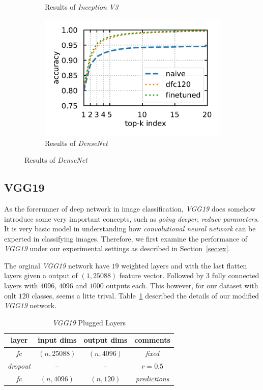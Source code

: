 \documentclass{article}
\begin{document}
\begin{figure}[h]
\begin{subfigure}{0.48\linewidth}
		\caption{Results of \emph{Inception V3}}
		\label{fig:incetionp}
	\end{subfigure} 
	\begin{subfigure}{0.48\linewidth}
		\centering
		\includegraphics[width=\linewidth]{pics/DenseNet}
		\caption{Results of \emph{DenseNet}}
		\label{fig:densenet}
	\end{subfigure} 
\end{figure}

\subsection{VGG19}
As the forerunner of deep network in image classification, \emph{VGG19} does somehow introduce some very important concepts, such as \emph{going deeper}, \emph{reduce parameters}. 
It is very basic model in understanding how \emph{convolutional neural network} can be experted in classifying images. 
Therefore, we first examine the performance of \emph{VGG19} under our experimental settings as described in Section~\ref{sec:ex}.

The orginal \emph{VGG19} network have $19$ weighted layers and with the last flatten layers given a output of $(1, 25088)$ feature vector. 
Followed by $3$ fully connected layers with $4096$, $4096$ and $1000$ outputs each. 
This however, for our dataset with onlt $120$ classes, seems a litte trival. 
Table~\ref{tab:vgg19} described the details of our modified \emph{VGG19} network. 
\begin{table}[t]
	\centering
	\caption{\emph{VGG19} Plugged Layers}
	\label{tab:vgg19}
	\begin{tabular}{c|ccc}
		\toprule
		layer & input dims & output dims & comments \\
		\midrule
		\emph{fc} & $(n, 25088)$ & $(n,4096)$ & \emph{fixed} \\
		\emph{dropout} & -- & -- &  $r =  0.5$ \\
		\emph{fc} & $(n,4096)$ & $(n,120)$ & \emph{predictions} \\
		\bottomrule
	\end{tabular}
\end{table}
\end{document}
